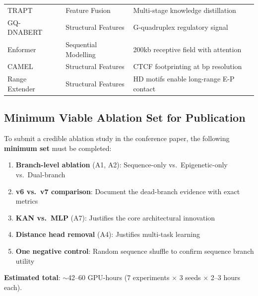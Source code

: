 \documentclass[11pt,a4paper]{article}
\begin{document}
\begin{longtable}{L{3.5cm}L{4cm}L{5.5cm}}
TRAPT~\cite{trapt} & Feature Fusion & Multi-stage knowledge distillation \\

GQ-DNABERT~\cite{gq_dnbert} & Structural Features & G-quadruplex regulatory signal \\

Enformer~\cite{enformer} & Sequential Modelling & 200kb receptive field with attention \\

CAMEL~\cite{camel_ctcf} & Structural Features & CTCF footprinting at bp resolution \\

Range Extender~\cite{range_extender} & Structural Features & HD motifs enable long-range E-P contact \\

\end{longtable}



\subsection{Minimum Viable Ablation Set for Publication}

To submit a credible ablation study in the conference paper, the following \textbf{minimum set} must be completed:

\begin{enumerate}
    \item \textbf{Branch-level ablation} (A1, A2): Sequence-only vs.\ Epigenetic-only vs.\ Dual-branch
    \item \textbf{v6 vs.\ v7 comparison}: Document the dead-branch evidence with exact metrics
    \item \textbf{KAN vs.\ MLP} (A7): Justifies the core architectural innovation
    \item \textbf{Distance head removal} (A4): Justifies multi-task learning
    \item \textbf{One negative control}: Random sequence shuffle to confirm sequence branch utility
\end{enumerate}

\textbf{Estimated total}: $\sim$42--60 GPU-hours (7 experiments $\times$ 3 seeds $\times$ 2--3 hours each).
\end{document}
